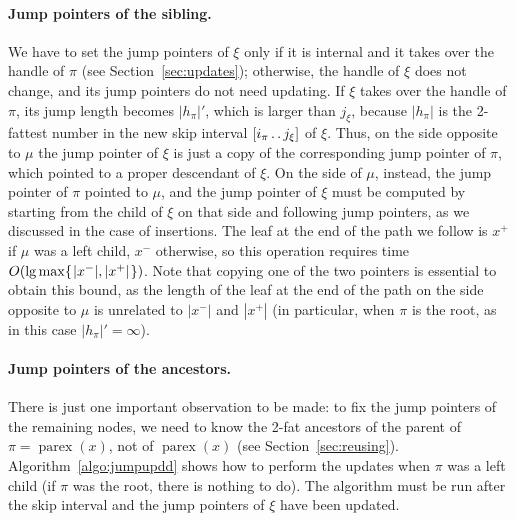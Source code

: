 \documentclass[a4paper]{article}
\newcommand{\parex}[1]{\operatorname{parex}(#1)}
\newcommand{\?}{\mskip1.5mu}
\def\..{\,\mathpunct{\ldotp\ldotp}} %
\begin{document}
\paragraph{Jump pointers of the sibling.} 
We have to set the jump pointers of $\xi$
only if it is internal and it takes over the handle of $\pi$ (see Section~\ref{sec:updates}); otherwise, the handle of $\xi$ does not change, and
its jump pointers do not need updating. 
If $\xi$ takes over the handle of $\pi$, its jump length becomes $|h_\pi|'$, which is larger than $j_\xi$, because $|h_\pi|$ is the 2-fattest 
number in the new skip interval $[i_\pi\..j_\xi]$ of $\xi$. Thus, on the side opposite to $\mu$ the jump pointer of $\xi$ 
is just a copy of the corresponding jump pointer of $\pi$, which pointed to a proper descendant of $\xi$. 
On the side of $\mu$, instead, the jump pointer of $\pi$ pointed to $\mu$, and the jump pointer of $\xi$ must be 
computed by starting from the child of $\xi$ on that side and following jump pointers, as we discussed in the case of insertions. 
The leaf at the end of the path we follow is $x^+$ if $\mu$ was a left child, $x^-$ otherwise, so this operation
requires time $O(\lg\max\{\?|x^-|,|x^+|\?\})$. Note that copying one of the two pointers is essential to obtain this bound, 
as the length of the leaf at the end of the path on the side opposite to $\mu$ is unrelated to $|x^-|$ and $|x^+|$
(in particular, when $\pi$ is the root, as in this case $|h_\pi|'=\infty$). 

\paragraph{Jump pointers of the ancestors.} 
There is just one important observation to be made: to fix the jump pointers of the remaining nodes, we
need to know the 2-fat ancestors of the parent of $\pi=\parex x$, not of $\parex x$ (see Section~\ref{sec:reusing}). 
Algorithm~\ref{algo:jumpupdd}
shows how to perform the updates when $\pi$ was a left child (if $\pi$ was the root, there is nothing to do). 
The algorithm must be run after the skip interval and the jump pointers of $\xi$ have been updated.
\end{document}
